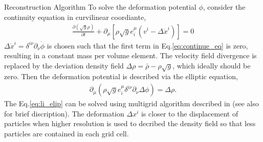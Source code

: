 \begin{section}{Reconstruction Algorithm}
  To solve the deformation potential $\phi$, consider the continuity
  equation in curvilinear coordiante,
  \begin{align}
    \label{eq:continue_eq}
    \frac{\partial (\sqrt{g} \rho) }{\partial t}+
    \partial_\mu \left[\rho \sqrt{g} e^\mu _i \left(v^i - 
    \Delta \dot{x}^i \right) \right] =0
  \end{align}
  $\Delta \dot{x}^i=\delta ^{i\nu}\partial _\nu \dot{\phi}$ is chosen
  such that the first term in Eq.\ref{eq:continue_eq} is zero,
  resulting in a constant mass per volume element.  The velocity field
  divergence is replaced by the deviation density field
  $\Delta \rho = \bar{\rho}-\rho \sqrt{g}$, which ideally should be
  zero.  Then the deformation potential is described via the elliptic
  equation,
  \begin{align}
    \label{eq:li_elip}
    \partial _\mu (\rho \sqrt{g} e^\mu _i \delta^{i\nu}
    \partial_\nu \Delta \phi)=\Delta \rho.
  \end{align}
  The Eq.\ref{eq:li_elip} can be solved using multigrid algorithm
  described in \cite{bib:Pen1995,bib:Pen1998} (see also
  \cite{bib:ZhuH2016} for brief discription).  The deformation
  $\Delta x^i$ is closer to the displacement of particles when higher
  resolution is used to decribed the density field so that less
  particles are contained in each grid cell.
\end{section}

